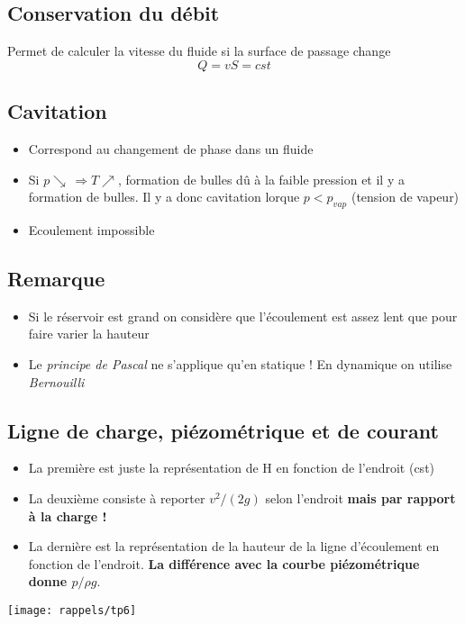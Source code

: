 \subsection*{Conservation du débit}
Permet de calculer la vitesse du fluide si la surface de passage change 
\begin{equation}
	Q = vS = cst
\end{equation}

\subsection*{Cavitation}
\begin{itemize}
	\item Correspond au changement de phase dans un fluide
	\item Si $p \searrow \, \Rightarrow T \nearrow$, formation de bulles dû à la faible pression et il y a formation de bulles. Il y a donc cavitation lorque $p < p_{vap}$ (tension de vapeur)
	\item Ecoulement impossible
\end{itemize}

\subsection*{Remarque}
\begin{itemize}
	\item Si le réservoir est grand on considère que l'écoulement est assez lent que pour faire varier la hauteur
	\item Le \textit{principe de Pascal} ne s'applique qu'en statique ! En dynamique on utilise \textit{Bernouilli}
\end{itemize}

\subsection*{Ligne de charge, piézométrique et de courant}
\begin{itemize}
	\item La première est juste la représentation de H en fonction de l'endroit (cst)
	\item La deuxième consiste à reporter $v^2/(2 g)$ selon l'endroit \textbf{mais par rapport à la charge !}
	\item La dernière est la représentation de la hauteur de la ligne d'écoulement en fonction de l'endroit. \textbf{La différence avec la courbe piézométrique donne $p/\rho g$}.
\end{itemize}
\begin{center}
	\texttt{[image: rappels/tp6]}
\end{center}